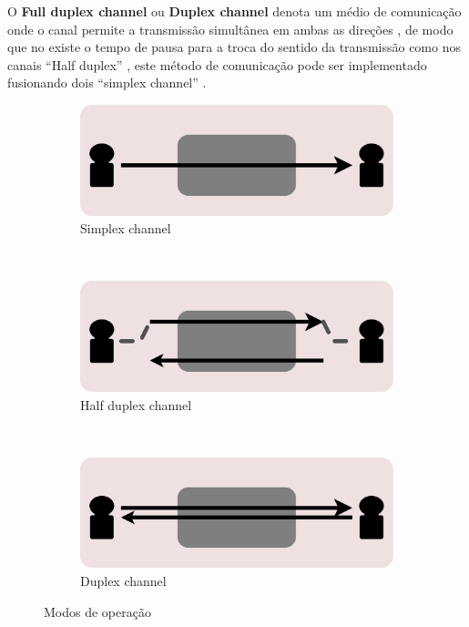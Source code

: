 \documentclass[a4paper,10pt]{article}
\begin{document}
O \textbf{Full duplex channel} ou  \textbf{Duplex channel} denota um médio de comunicação onde o
canal permite a transmissão simultânea em ambas as direções \cite[pp. 150]{sawaya2002dicionario},
de modo que no existe o tempo de pausa para a troca do sentido da transmissão como nos canais ``Half duplex'' \cite[pp. 5]{shinde2009computer},
este método de comunicação pode ser implementado fusionando dois ``simplex channel'' \cite[pp. 60]{hura2001data}.
\begin{figure}[ht!]
    \centering
    \begin{subfigure}[b]{0.3\textwidth}
        \includegraphics[width=\textwidth]{channel-simplex.eps}
        \caption{Simplex channel}
        \label{fig:channelsimplex}
    \end{subfigure}
    ~ %
    \begin{subfigure}[b]{0.3\textwidth}
        \includegraphics[width=\textwidth]{channel-halfduplex.eps}
        \caption{Half duplex channel}
        \label{fig:channelhalfduplex}
    \end{subfigure}
    ~ %
    \begin{subfigure}[b]{0.3\textwidth}
        \includegraphics[width=\textwidth]{channel-duplex.eps}
        \caption{Duplex channel}
        \label{fig:channelduplex}
    \end{subfigure}
    \caption{Modos de operação}\label{fig:channeltypes}
\end{figure}
\end{document}
